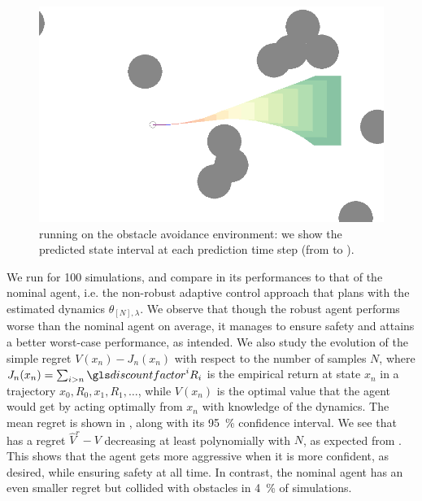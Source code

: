 \begin{figure}[ht]
	\centering
	\includegraphics[width=0.7\linewidth]{img/obstacle_small}
	\caption{ running on the obstacle avoidance environment: we show the predicted state interval at each prediction time step (from  to ).}
	\label{fig:obstacle-env}
\end{figure}

We run  for 100 simulations, and compare in  its performances to that of the nominal agent, i.e. the non-robust adaptive control approach that plans with the estimated dynamics $\theta_{[N],\lambda}$. We observe that though the robust agent performs worse than the nominal agent on average, it manages to ensure safety and attains a better worst-case performance, as intended. We also study the evolution of the simple regret $V(x_n) - J_n(x_n)$ with respect to the number of samples $N$, where $J_n(x_n) = \sum_{i > n} \discount^i R_i$ is the empirical return at state $x_n$ in a trajectory $x_0, R_0, x_1, R_1, \dots$, while $V(x_n)$ is the optimal value that the agent would get by acting optimally from $x_n$ with knowledge of the dynamics. The mean regret is shown in , along with its \SI{95}{\percent} confidence interval. We see that  has a regret $\hat{V}^r - V$ decreasing at least polynomially with $N$, as expected from . This shows that the agent gets more aggressive when it is more confident, as desired, while ensuring safety at all time. In contrast, the nominal agent has an even smaller regret but collided with obstacles in \SI{4}{\percent} of simulations.

